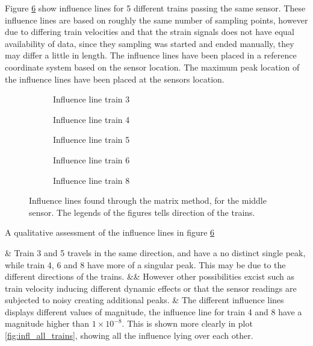 Figure \ref{fig:Influence_lines} show influence lines for 5 different trains passing the same sensor. These influence lines are based on roughly the same number of sampling points, however due to differing train velocities and that the strain signals does not have equal availability of data, since they sampling was started and ended manually, they may differ a little in length. The influence lines have been placed in a reference coordinate system based on the sensor location. The maximum peak location of the influence lines have been placed at the sensors location.
	\begin{figure}[htpb]
		\centering
		\begin{subfigure}[t]{0.43\textwidth}
			\centering
			
			\caption{Influence line train 3}
			\label{fig:train3}
		\end{subfigure}
		\qquad \qquad
		\begin{subfigure}[t]{0.43\textwidth}
			\centering
			
			\caption{Influence line train 4}
			\label{fig:train4}
		\end{subfigure}
		\centering
		\begin{subfigure}[t]{0.43\textwidth}
			\centering
			
			\caption{Influence line train 5}
			\label{fig:train5}
		\end{subfigure}
		\qquad \qquad
		\begin{subfigure}[t]{0.43\textwidth}
			\centering
			
			\caption{Influence line train 6}
			\label{fig:train6}
		\end{subfigure}
		\centering
		\begin{subfigure}[t]{0.97\textwidth}
			\centering
			
			\caption{Influence line train 8}
			\label{fig:train8}
		\end{subfigure}

		\caption{Influence lines found through the matrix method, for the middle sensor. The legends of the figures tells direction of the trains.}
		\label{fig:Influence_lines}
	\end{figure}

A qualitative assessment of the influence lines in figure \ref{fig:Influence_lines}
\begin{easylist}[itemize]
	& Train 3 and 5 travels in the same direction, and have a no distinct single peak, while train 4, 6 and 8 have more of a singular peak. This may be due to the different directions of the trains.
	&& However other possibilities excist such as train velocity inducing different dynamic effects or that the sensor readings are subjected to noisy creating additional peaks.
	& The different influence lines displays different values of magnitude, the influence line for train 4 and 8 have a magnitude higher than $ 1 \times 10^{-8} $. This is shown more clearly in plot \ref{fig:infl_all_trains}, showing all the influence lying over each other.
\end{easylist}

